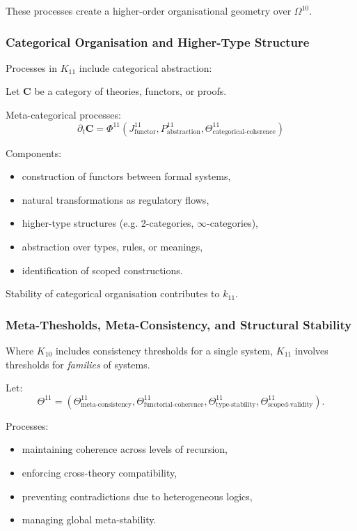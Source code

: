 These processes create a higher-order organisational geometry over $\Omega^{10}$.

\subsubsection{Categorical Organisation and Higher-Type Structure}

Processes in $K_{11}$ include categorical abstraction:

Let $\mathbf{C}$ be a category of theories, functors, or proofs.

Meta-categorical processes:
\[
\partial_t \mathbf{C} = 
\Phi^{11}(J^{11}_{\text{functor}}, 
          P^{11}_{\text{abstraction}}, 
          \Theta^{11}_{\text{categorical-coherence}})
\]

Components:
\begin{itemize}
    \item construction of functors between formal systems,
    \item natural transformations as regulatory flows,
    \item higher-type structures (e.g. 2-categories, $\infty$-categories),
    \item abstraction over types, rules, or meanings,
    \item identification of scoped constructions.
\end{itemize}

Stability of categorical organisation contributes to $k_{11}$.

\subsubsection{Meta-Thesholds, Meta-Consistency, and Structural Stability}

Where $K_{10}$ includes consistency thresholds for a single system,  
$K_{11}$ involves thresholds for \emph{families} of systems.

Let:
\[
\Theta^{11} = 
(\Theta^{11}_{\text{meta-consistency}},
 \Theta^{11}_{\text{functorial-coherence}},
 \Theta^{11}_{\text{type-stability}},
 \Theta^{11}_{\text{scoped-validity}}).
\]

Processes:
\begin{itemize}
    \item maintaining coherence across levels of recursion,
    \item enforcing cross-theory compatibility,
    \item preventing contradictions due to heterogeneous logics,
    \item managing global meta-stability.
\end{itemize}

